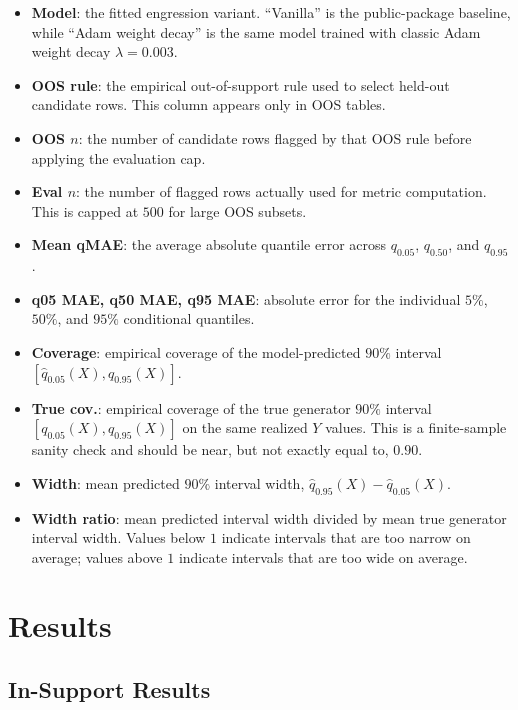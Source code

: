 \documentclass[11pt]{article}
\begin{document}
\begin{itemize}
  \item \textbf{Model}: the fitted engression variant.  ``Vanilla'' is the
  public-package baseline, while ``Adam weight decay'' is the same model
  trained with classic Adam weight decay \(\lambda=0.003\).
  \item \textbf{OOS rule}: the empirical out-of-support rule used to select
  held-out candidate rows.  This column appears only in OOS tables.
  \item \textbf{OOS \(n\)}: the number of candidate rows flagged by that OOS
  rule before applying the evaluation cap.
  \item \textbf{Eval \(n\)}: the number of flagged rows actually used for
  metric computation.  This is capped at \(500\) for large OOS subsets.
  \item \textbf{Mean qMAE}: the average absolute quantile error across
  \(q_{0.05}\), \(q_{0.50}\), and \(q_{0.95}\).
  \item \textbf{q05 MAE, q50 MAE, q95 MAE}: absolute error for the individual
  \(5\%\), \(50\%\), and \(95\%\) conditional quantiles.
  \item \textbf{Coverage}: empirical coverage of the model-predicted
  \(90\%\) interval
  \([\widehat{q}_{0.05}(X),\widehat{q}_{0.95}(X)]\).
  \item \textbf{True cov.}: empirical coverage of the true generator
  \(90\%\) interval \([q_{0.05}(X),q_{0.95}(X)]\) on the same realized
  \(Y\) values.  This is a finite-sample sanity check and should be near, but
  not exactly equal to, \(0.90\).
  \item \textbf{Width}: mean predicted \(90\%\) interval width,
  \(\widehat{q}_{0.95}(X)-\widehat{q}_{0.05}(X)\).
  \item \textbf{Width ratio}: mean predicted interval width divided by mean
  true generator interval width.  Values below \(1\) indicate intervals that
  are too narrow on average; values above \(1\) indicate intervals that are too
  wide on average.
\end{itemize}

\section{Results}

\subsection{In-Support Results}
\end{document}
